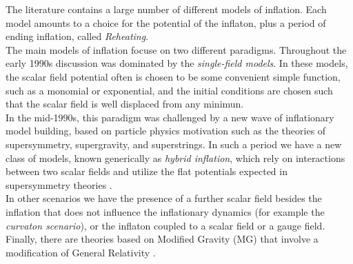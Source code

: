 \documentclass[11pt,a4paper,twoside]{book}
\begin{document}
The literature contains a large number of different models of inflation. Each model amounts to a choice for the potential  of the inflaton, plus a period of ending inflation, called \textit{Reheating}.\\
The main models of inflation focuse on two different paradigms. Throughout the early 1990s discussion was dominated by the \textit{single-field models}. In these models, the scalar field potential often is chosen to be some convenient simple function, such as a monomial or exponential, and the initial conditions are chosen such that the scalar field is well displaced from any minimun.\\
In the mid-1990s, this paradigm was challenged by a new wave of inflationary model building, based on particle physics motivation such as the theories of supersymmetry, supergravity, and superstrings. In such a period we have a new class of models, known generically as \textit{hybrid inflation}, which rely on interactions between two scalar fields and utilize the flat potentials expected in supersymmetry theories \cite{Liddle:intro}. \\
In other scenarios we have the presence of a further scalar field besides the inflation that does not influence the inflationary dynamics (for example the \textit{curvaton scenario}), or the inflaton coupled to a scalar field or a gauge field. Finally, there are theories based on Modified Gravity (MG) that involve a modification of General Relativity \cite{GWFromInflation:Intro}.\\
\end{document}
